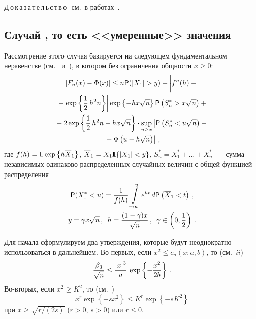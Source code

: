 \begin{multicols}{2}
\smallskip

\noindent
Д\,о\,к\,а\,з\,а\,т\,е\,л\,ь\,с\,т\,в\,о\,\ см.\ в работах~\cite{Paditz81, Tysiak}.

\subsection{Случай , то есть <<умеренные>> значения~}

Рассмотрение этого случая базируется на следующем фундаментальном
неравенстве (см.~\cite{Mich81} и~\cite{Tysiak}), в котором без
ограничения общности $x\ge0$:
\begin{multline}
\left|F_n(x)-\Phi(x)\right|\le n{\sf P}(|X_1|>y)
+
\left|
\vphantom{\fr{1}{2}}
f^n(h)-{}\right.\\
\left.{}-\exp\left\{\fr{1}{2}\,h^2n\right\}\right|
\exp\left\{-hx\sqrt{n}\right\}{\sf P}\left(S_n^*>x\sqrt{n}\right)+{}\\
{}+
2\exp\left\{\fr{1}{2}\,h^2n-hx\sqrt{n}\right\}\cdot\sup_{u\ge x}
\left|{\sf P}\left(S_n^*<u\sqrt{n}\right)-{}\right.\\
\left.{}-\Phi\left(u-h\sqrt{n}\right)\right|\,,
\label{e8gv}
\end{multline}
где $f(h)={\sf E}\exp\left\{h\overline{X}_1\right\}$,
$\overline{X}_1=X_1{\rm I\hspace{-0.7mm}I}\{|X_1|<y\}$, $S_n^*=X_1^*+\ldots+X_n^*$~---
сумма независимых одинаково распределенных случайных величин с
общей функцией распределения
\begin{gather*}
{\sf P}(X_1^*<u)=\displaystyle\frac{\displaystyle 1\mathstrut}{\displaystyle f(h)\mathstrut}\int\limits_{-\infty}^{u}e^{ht}\,d{\sf
P}\left(\overline{X}_1<t\right)\,,\\
y=\gamma x\sqrt{n}\,,\enskip h=\displaystyle\frac{\displaystyle (1-\gamma)x\mathstrut}{\displaystyle \sqrt{n}\mathstrut}\,,\enskip \gamma\in\left(0,\displaystyle\frac{\displaystyle 1\mathstrut}{\displaystyle 2\mathstrut}\right)\,.
\end{gather*}

Для начала сформулируем два утверждения, которые будут
неоднократно использоваться в дальнейшем. Во-первых, если $x^2\le
c_n(x;a,b)$, то (см.~$ii$)
\begin{equation}
\displaystyle\frac{\displaystyle \beta_{3}\mathstrut}{\displaystyle \sqrt{n}\mathstrut}\le\displaystyle\frac{\displaystyle |x|^{3}\mathstrut}{\displaystyle a\mathstrut}\,\exp\left\{-\displaystyle\frac{\displaystyle x^2\mathstrut}{\displaystyle 2b\mathstrut}\right\}\,.\label{e9gv}
\end{equation}
Во-вторых, если $x^2\ge K^2$, то (см.~\cite{Paditz81})
\begin{equation}
x^r\exp\left\{-sx^2\right\}\le K^r\exp\left\{-sK^2\right\}\label{e10gv}
\end{equation}
при $x\ge\sqrt{r/(2s)}$ ($r>0$, $s>0$) или $r\le 0$.


\end{multicols}
